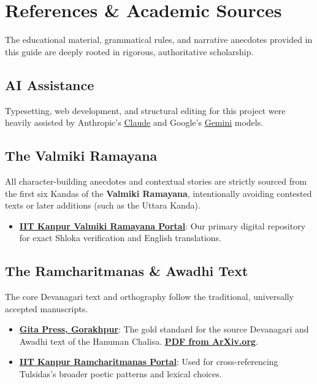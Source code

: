 \newpage
{}
{}
\section*{References \& Academic Sources}

The educational material, grammatical rules, and narrative anecdotes provided in this guide are deeply rooted in rigorous, authoritative scholarship.

\subsection*{AI Assistance}
Typesetting, web development, and structural editing for this project were heavily assisted by Anthropic's \href{https://claude.ai}{Claude} and Google's \href{https://gemini.google.com}{Gemini} models.

\subsection*{The Valmiki Ramayana}
All character-building anecdotes and contextual stories are strictly sourced from the first six Kandas of the \textbf{Valmiki Ramayana}, intentionally avoiding contested texts or later additions (such as the Uttara Kanda).
\begin{itemize}
    \item \href{https://www.valmiki.iitk.ac.in}{\textbf{IIT Kanpur Valmiki Ramayana Portal}}: Our primary digital repository for exact Shloka verification and English translations.
\end{itemize}

\subsection*{The Ramcharitmanas \& Awadhi Text}
The core Devanagari text and orthography follow the traditional, universally accepted manuscripts.
\begin{itemize}
    \item \href{https://gitapress.org/result?search=Hanuman%20Chalisa&category=}{\textbf{Gita Press, Gorakhpur}}: The gold standard for the source Devanagari and Awadhi text of the Hanuman Chalisa. \href{https://dn710202.ca.archive.org/0/items/xqZf_shri-hanuman-chalisha-gita-press/Shri%20Hanuman%20Chalisha%20-%20Gita%20Press.pdf}{\textbf{PDF from ArXiv.org}}.


    \item \href{https://www.ramcharitmanas.iitk.ac.in/content/tulsidas}{\textbf{IIT Kanpur Ramcharitmanas Portal}}: Used for cross-referencing Tulsidas's broader poetic patterns and lexical choices.
\end{itemize}

